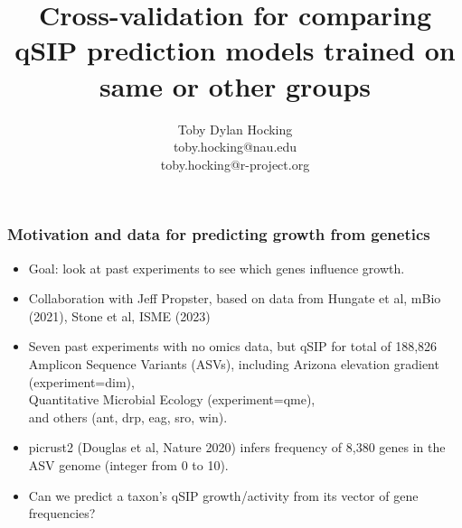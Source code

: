 \documentclass{beamer}
\begin{document}
\title{Cross-validation for comparing qSIP prediction models trained
  on same or other groups}

\author{
  Toby Dylan Hocking\\
  toby.hocking@nau.edu\\
  toby.hocking@r-project.org\\
}

\maketitle

\begin{frame}
  \frametitle{Motivation and data for predicting growth from genetics}
  \begin{itemize}
  \item Goal: look at past experiments to see which genes influence growth.
  \item Collaboration with Jeff Propster, based on data from Hungate
    et al, mBio (2021), Stone et al, ISME (2023)
  \item Seven past experiments with no omics data, but
    qSIP for total of 188,826 Amplicon Sequence Variants (ASVs),
    including Arizona elevation gradient (experiment=dim),
    \\ Quantitative Microbial Ecology (experiment=qme),
    \\and others (ant, drp, eag, sro, win).
  \item picrust2 (Douglas et al, Nature 2020) infers frequency of 8,380 genes
    in the ASV genome (integer from 0 to 10).
  \item Can we predict a taxon's qSIP growth/activity from its vector of gene frequencies?
    \end{itemize}
\end{frame}
\end{document}
